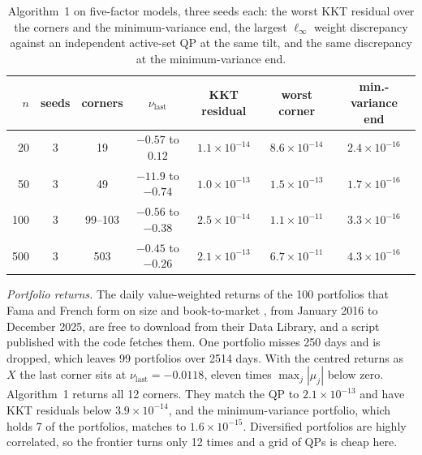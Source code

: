 \documentclass[11pt]{article}
\begin{document}
\begin{table}[t]
\centering
\small\setlength{\tabcolsep}{4.5pt}
\begin{tabular}{rcccccc}
\toprule
$n$ & seeds & corners & $\nu_{\mathrm{last}}$ & KKT residual & worst corner
& min.-variance end\\
\midrule
20 & 3 & 19 & $-0.57$ to $0.12$ & $1.1\times10^{-14}$ & $8.6\times10^{-14}$
& $2.4\times10^{-16}$\\
50 & 3 & 49 & $-11.9$ to $-0.74$ & $1.0\times10^{-13}$ & $1.5\times10^{-13}$
& $1.7\times10^{-16}$\\
100 & 3 & 99--103 & $-0.56$ to $-0.38$ & $2.5\times10^{-14}$ & $1.1\times10^{-11}$
& $3.3\times10^{-16}$\\
500 & 3 & 503 & $-0.45$ to $-0.26$ & $2.1\times10^{-13}$ & $6.7\times10^{-11}$
& $4.3\times10^{-16}$\\
\bottomrule
\end{tabular}
\caption{Algorithm~1 on five-factor models, three seeds each: the worst KKT residual over
the corners and the minimum-variance end, the largest $\ell_\infty$ weight discrepancy
against an independent active-set QP at the same tilt, and the same discrepancy at the
minimum-variance end.}
\label{tab:robust}
\end{table}

\emph{Portfolio returns.} The daily value-weighted returns of the 100
portfolios that Fama and French form on size and book-to-market \cite{french}, from
January 2016 to December 2025, are free to download from their Data Library, and a
script published with the code fetches them. One portfolio misses 250
days and is dropped, which leaves 99 portfolios over 2514 days. With the centred returns
as $X$ the last corner sits at $\nu_{\mathrm{last}}=-0.0118$, eleven times
$\max_j|\mu_j|$ below zero. Algorithm~1 returns all 12 corners. They match the QP to
$2.1\times10^{-13}$ and have KKT residuals below $3.9\times10^{-14}$, and the
minimum-variance portfolio, which holds 7 of the portfolios, matches to
$1.6\times10^{-15}$. Diversified portfolios are highly correlated, so the frontier turns
only 12 times and a grid of QPs is cheap here.
\end{document}
